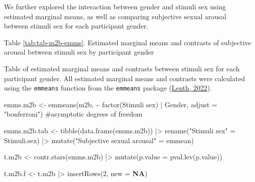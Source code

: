 \documentclass[
  bookmarksnumbered]{article}
\newenvironment{Shaded}{\begin{snugshade}}{\end{snugshade}}
\newcommand{\AttributeTok}[1]{\textcolor[rgb]{0.80,0.80,0.80}{#1}}
\newcommand{\CommentTok}[1]{\textcolor[rgb]{0.50,0.62,0.50}{#1}}
\newcommand{\ConstantTok}[1]{\textcolor[rgb]{0.86,0.64,0.64}{\textbf{#1}}}
\newcommand{\DecValTok}[1]{\textcolor[rgb]{0.86,0.86,0.80}{#1}}
\newcommand{\FunctionTok}[1]{\textcolor[rgb]{0.94,0.94,0.56}{#1}}
\newcommand{\NormalTok}[1]{\textcolor[rgb]{0.80,0.80,0.80}{#1}}
\newcommand{\OtherTok}[1]{\textcolor[rgb]{0.94,0.94,0.56}{#1}}
\newcommand{\SpecialCharTok}[1]{\textcolor[rgb]{0.86,0.64,0.64}{#1}}
\newcommand{\StringTok}[1]{\textcolor[rgb]{0.80,0.58,0.58}{#1}}
\begin{document}
We further explored the interaction between gender and stimuli sex using estimated marginal means, as well as comparing subjective sexual arousal between stimuli sex for each participant gender.

Table \ref{tab:tab-m2b-emms}. Estimated marginal means and contrasts of subjective arousal between stimuli sex by participant gender

Table of estimated marginal means and contrasts between stimuli sex for each participant gender. All estimated marginal means and contrasts were calculated using the \texttt{emmeans} function from the \texttt{emmeans} package (\protect\hyperlink{ref-emmeanscit}{Lenth, 2022}).

\begin{Shaded}
\begin{Highlighting}[]
\NormalTok{emms.m2b }\OtherTok{\textless{}{-}} \FunctionTok{emmeans}\NormalTok{(m2b, }\SpecialCharTok{\textasciitilde{}} \FunctionTok{factor}\NormalTok{(}\StringTok{\textasciigrave{}}\AttributeTok{Stimuli sex}\StringTok{\textasciigrave{}}\NormalTok{) }\SpecialCharTok{|}\NormalTok{ Gender,}
                    \AttributeTok{adjust =} \StringTok{"bonferroni"}\NormalTok{) }\CommentTok{\#asymptotic degrees of freedom}

\NormalTok{emms.m2b.tab }\OtherTok{\textless{}{-}} \FunctionTok{tibble}\NormalTok{(}\FunctionTok{data.frame}\NormalTok{(emms.m2b)) }\SpecialCharTok{|\textgreater{}}
  \FunctionTok{rename}\NormalTok{(}\StringTok{"Stimuli sex"} \OtherTok{=}\NormalTok{ Stimuli.sex) }\SpecialCharTok{|\textgreater{}} 
  \FunctionTok{mutate}\NormalTok{(}\StringTok{"Subjective sexual arousal"} \OtherTok{=}\NormalTok{ emmean)}

\NormalTok{t.m2b }\OtherTok{\textless{}{-}} \FunctionTok{contr.stars}\NormalTok{(emms.m2b) }\SpecialCharTok{|\textgreater{}} 
  \FunctionTok{mutate}\NormalTok{(}\AttributeTok{p.value =} \FunctionTok{pval.lev}\NormalTok{(p.value))}

\NormalTok{t.m2b.f }\OtherTok{\textless{}{-}}\NormalTok{ t.m2b }\SpecialCharTok{|\textgreater{}} 
  \FunctionTok{insertRows}\NormalTok{(}\DecValTok{2}\NormalTok{, }\AttributeTok{new =} \ConstantTok{NA}\NormalTok{)}


\end{Highlighting}
\end{Shaded}
\end{document}
